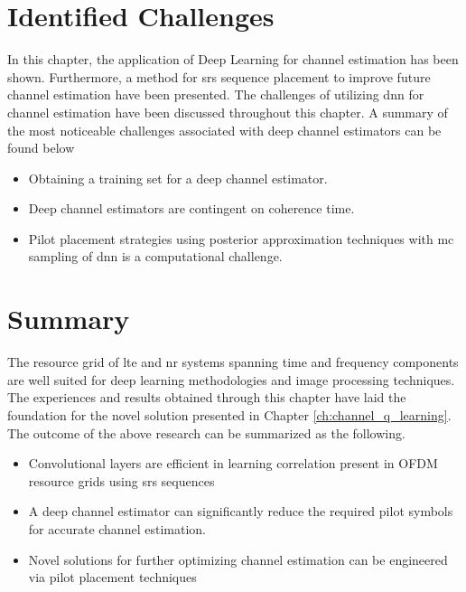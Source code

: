 \section{Identified Challenges}\label{sec:channel_estimation_challenges}
In this chapter, the application of Deep Learning for channel estimation has been shown. Furthermore, a method for \gls{srs} sequence placement to improve future channel estimation have been presented. The challenges of utilizing \gls{dnn} for channel estimation have been discussed throughout this chapter. A summary of the most noticeable challenges associated with deep channel estimators can be found below
\begin{itemize}
    \item Obtaining a training set for a deep channel estimator.
    \item Deep channel estimators are contingent on coherence time.
    \item Pilot placement strategies using posterior approximation techniques with \gls{mc} sampling of \gls{dnn} is a computational challenge.
\end{itemize}

\section{Summary}
The resource grid of \gls{lte} and \gls{nr} systems spanning time and frequency components are well suited for deep learning methodologies and image processing techniques. The experiences and results obtained through this chapter have laid the foundation for the novel solution presented in  Chapter \ref{ch:channel_q_learning}. The outcome of the above research can be summarized as the following.

\begin{itemize}
    \item Convolutional layers are efficient in learning correlation present in OFDM resource grids using \gls{srs} sequences
    \item A deep channel estimator can significantly reduce the required pilot symbols for accurate channel estimation.
    \item Novel solutions for further optimizing channel estimation can be engineered via pilot placement techniques 
\end{itemize}